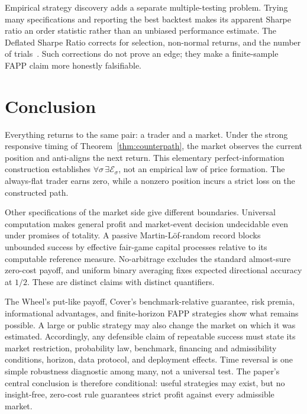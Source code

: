 \documentclass[aps,pra,reprint,superscriptaddress,amsmath,amssymb,floatfix]{revtex4-2}
\theoremstyle{plain}
\theoremstyle{definition}
\theoremstyle{remark}
\begin{document}
Empirical strategy discovery adds a separate multiple-testing problem. Trying
many specifications and reporting the best backtest makes its apparent Sharpe
ratio an order statistic rather than an unbiased performance estimate. The
Deflated Sharpe Ratio corrects for selection, non-normal returns, and the
number of trials~\cite{BaileyLopez2014}. Such corrections do not prove an edge;
they make a finite-sample FAPP claim more honestly falsifiable.

\section{Conclusion}
\label{sec:conclusion}

Everything returns to the same pair: a trader and a market. Under the strong
responsive timing of Theorem~\ref{thm:counterpath}, the market observes the
current position and anti-aligns the next return. This elementary
perfect-information construction establishes
\(\forall\sigma\,\exists\mathcal E_\sigma\), not an empirical law of price
formation. The always-flat trader earns zero, while a nonzero position incurs
a strict loss on the constructed path.

Other specifications of the market side give different boundaries. Universal
computation makes general profit and market-event decision undecidable even
under promises of totality. A passive Martin-L\"of-random record blocks
unbounded success by effective fair-game capital processes relative to its
computable reference measure. No-arbitrage excludes the standard almost-sure
zero-cost payoff, and uniform binary averaging fixes expected directional
accuracy at \(1/2\). These are distinct claims with distinct quantifiers.

The Wheel's put-like payoff, Cover's benchmark-relative guarantee, risk
premia, informational advantages, and finite-horizon FAPP strategies show what
remains possible. A large or public strategy may also change the market on
which it was estimated. Accordingly, any defensible claim of repeatable
success must state its market restriction, probability law, benchmark,
financing and admissibility conditions, horizon, data protocol, and deployment
effects. Time reversal is one simple robustness diagnostic among many, not a
universal test. The paper's central conclusion is therefore conditional:
useful strategies may exist, but no insight-free, zero-cost rule guarantees
strict profit against every admissible market.
\end{document}
